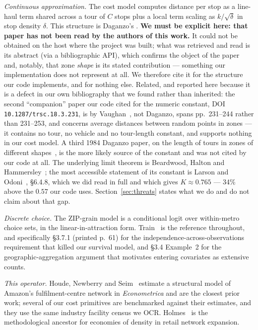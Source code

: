\documentclass[conference]{IEEEtran}
\begin{document}
\emph{Continuous approximation.} The cost model computes distance per stop as
a line-haul term shared across a tour of $C$ stops plus a local term scaling
as $k/\sqrt{\delta}$ in stop density $\delta$. This structure is Daganzo's
\cite{daganzo1984ts}. \textbf{We must be explicit here: that paper has not
been read by the authors of this work.} It could not be obtained on the host
where the project was built; what was retrieved and read is its abstract
(via a bibliographic API), which confirms the object of the paper and, notably,
that zone \emph{shape} is its stated contribution --- something our
implementation does not represent at all. We therefore cite it for the
structure our code implements, and for nothing else. Related, and reported
here because it is a defect in our own bibliography that we found rather than
inherited: the second ``companion'' paper our code cited for the numeric
constant, DOI \texttt{10.1287/trsc.18.3.231}, is by
Vaughan~\cite{vaughan1984}, not Daganzo, spans pp.~231--244 rather than
231--253, and concerns average distances between random points in zones --- it
contains no tour, no vehicle and no tour-length constant, and supports nothing
in our cost model. A third 1984 Daganzo paper, on the length of tours in zones
of different shapes~\cite{daganzo1984trb}, is the more likely source of the
constant and was not cited by our code at all. The underlying limit theorem is
Beardwood, Halton and Hammersley~\cite{bhh1959}; the most accessible statement
of its constant is Larson and Odoni~\cite{larsonodoni1981}, \S6.4.8, which we
did read in full and which gives $K \approx 0.765$ --- 34\% above the $0.57$
our code uses. Section~\ref{sec:threats} states what we do and do not claim
about that gap.

\emph{Discrete choice.} The ZIP-grain model is a conditional logit over
within-metro choice sets, in the linear-in-attraction form. Train~\cite{train2009}
is the reference throughout, and specifically \S3.7.1 (printed p.~61) for the
independence-across-observations requirement that killed our survival model,
and \S3.4 Example~2 for the geographic-aggregation argument that motivates
entering covariates as extensive counts.

\emph{This operator.} Houde, Newberry and Seim~\cite{houde2023} estimate a
structural model of Amazon's fulfilment-centre network in \emph{Econometrica}
and are the closest prior work; several of our cost primitives are benchmarked
against their estimates, and they use the same industry facility census we OCR.
Holmes~\cite{holmes2011} is the methodological ancestor for economies of
density in retail network expansion.
\end{document}
